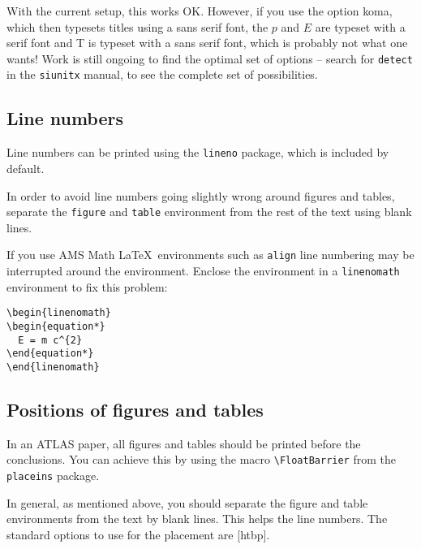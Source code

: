 \documentclass[atlasstyle,UKenglish]{latex/atlasdoc}
\newcommand{\Macro}[1]{\texttt{\textbackslash #1}\xspace}
\newcommand{\Option}[1]{\textsf{#1}\xspace}
\newcommand{\Package}[1]{\texttt{#1}\xspace}
\begin{document}
With the current setup, this works OK. 
However, if you use the option \Option{koma}, which then typesets titles using a sans serif font,
the $p$ and $E$ are typeset with a serif font and \textsf{T} is typeset with a sans serif font,
which is probably not what one wants!
Work is still ongoing to find the optimal set of options
-- search for \texttt{detect} in the \Package{siunitx} manual, to see the complete set of possibilities.


\subsection{Line numbers}

Line numbers can be printed using the \Package{lineno} package, 
which is included by default.

In order to avoid line numbers going slightly wrong around figures and tables,
separate the \Package{figure} and \Package{table} environment from the rest of the text using blank lines.

If you use AMS Math \LaTeX\ environments such as \Package{align} line numbering may be interrupted around the environment.
Enclose the environment in a \Package{linenomath} environment to fix this problem:
\begin{verbatim}
\begin{linenomath}
\begin{equation*}
  E = m c^{2}
\end{equation*}
\end{linenomath}
\end{verbatim}


\subsection{Positions of figures and tables}

In an ATLAS paper, all figures and tables should be printed before the conclusions.
You can achieve this by using the macro \Macro{FloatBarrier} from the
\Package{placeins} package.

In general, as mentioned above, you should separate the figure and table environments from the text by blank lines.
This helps the line numbers. The standard options to use for the placement are \Option{[htbp]}.
\end{document}
